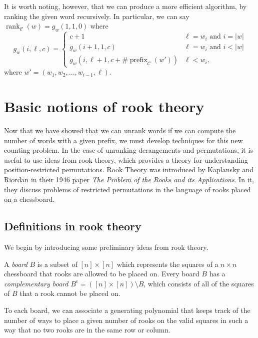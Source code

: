 It is worth noting, however, that we can produce a more efficient algorithm,
by ranking the given word recursively.
In particular, we can say
${\operatorname{rank}_\mathcal{C}(w) = g_w(1,1,0)}$ where
\begin{equation}
  g_w(i, \ell, c) = \begin{cases}
    c + 1 & \ell = w_i \text{ and } i = |w| \\
    g_w(i + 1, 1, c) & \ell = w_i \text{ and } i < |w| \\
    g_w(i, \ell + 1, c + \#\operatorname{prefix}_\mathcal{C}(w')) & \ell < w_i,
  \end{cases}
\end{equation}
where $w' = (w_1, w_2, \dots, w_{i-1}, \ell)$.

\section{Basic notions of rook theory}
Now that we have showed that we can unrank words if we can compute the number of
words with a given prefix, we must develop techniques for this new counting
problem.
In the case of unranking derangements and permutations, it is useful to use
ideas from rook theory, which provides a theory for understanding
position-restricted permutations.
Rook Theory was introduced by Kaplansky and Riordan \cite{Kaplansky1946}
in their 1946 paper \textit{The Problem of the Rooks and its Applications}. In
it, they discuss problems of restricted permutations in the language of rooks
placed on a chessboard.



\subsection{Definitions in rook theory}
We begin by introducing some preliminary ideas from rook theory.

\begin{definition}
  A \textit{board} $B$ is a subset of $[n] \times [n]$ which represents the
  squares of a $n \times n$ chessboard that rooks are allowed to be placed on.
  Every board $B$ has a \textit{complementary board}
  $B^c = ([n] \times [n]) \setminus B$, which consists of all of the
  squares of $B$ that a rook cannot be placed on.
\end{definition}

To each board, we can associate a generating polynomial that keeps track of the
number of ways to place a given number of rooks on the valid squares in such a
way that no two rooks are in the same row or column.

